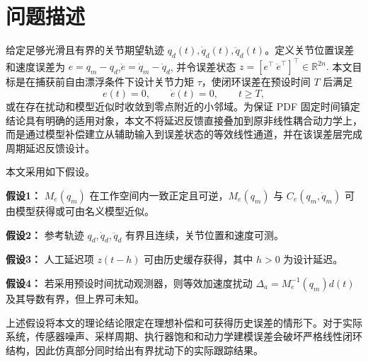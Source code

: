 \section{问题描述}

给定足够光滑且有界的关节期望轨迹 \(q_d(t),\dot q_d(t),\ddot q_d(t)\)。定义关节位置误差和速度误差为
\(
e=q_m-q_d\),\(\dot e=\dot q_m-\dot q_d\),
并令误差状态
\(
z=[e^\top\ \dot e^\top]^\top\in\mathbb R^{2n}.
\)
本文目标是在捕获前自由漂浮条件下设计关节力矩 \(\tau\)，使闭环误差在预设时间 \(T\) 后满足
\[
e(t)=0,\qquad \dot e(t)=0,\qquad t\ge T,
\]
或在存在扰动和模型近似时收敛到零点附近的小邻域。为保证 PDF 固定时间镇定结论具有明确的适用对象，本文不将延迟反馈直接叠加到原非线性耦合动力学上，而是通过模型补偿建立从辅助输入到误差状态的等效线性通道，并在该误差层完成周期延迟反馈设计。

本文采用如下假设。

\textbf{假设1：} \(M_e(q_m)\) 在工作空间内一致正定且可逆，\(M_e(q_m)\) 与 \(C_e(q_m,\dot q_m)\) 可由模型获得或可由名义模型近似。

\textbf{假设2：} 参考轨迹 \(q_d,\dot q_d,\ddot q_d\) 有界且连续，关节位置和速度可测。

\textbf{假设3：} 人工延迟项 \(z(t-h)\) 可由历史缓存获得，其中 \(h>0\) 为设计延迟。

\textbf{假设4：} 若采用预设时间扰动观测器，则等效加速度扰动 \(\Delta_a=M_e^{-1}(q_m)d(t)\) 及其导数有界，但上界可未知。


上述假设将本文的理论结论限定在理想补偿和可获得历史误差的情形下。对于实际系统，传感器噪声、采样周期、执行器饱和和动力学建模误差会破坏严格线性闭环结构，因此仿真部分同时给出有界扰动下的实际跟踪结果。
